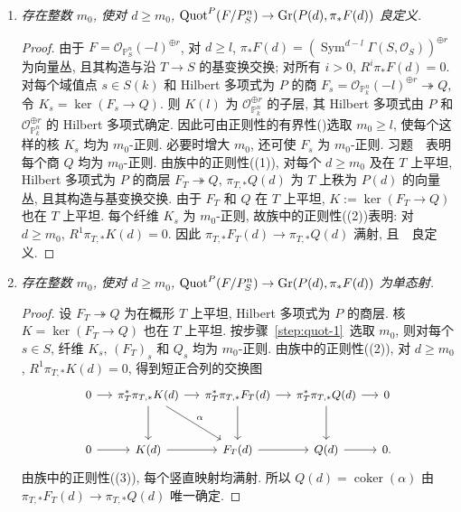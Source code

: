 \begin{enumerate}[步骤 1: ]
\item\label{step:quot-1}
\textit{存在整数 $m_0$, 使对 $d\geq m_0$, 
$\operatorname{Quot}^P(F/P_S^n)\to\operatorname{Gr}(P(d),\pi_*F(d))$ 良定义.}
\begin{proof}
由于 $F=\mathcal O_{\mathbb P_S^n}(-l)^{\oplus r}$, 对 $d\geq l$, 
$\pi_*F(d)=(\operatorname{Sym}^{d-l}\Gamma(S,\mathcal O_S))^{\oplus r}$
为向量丛, 且其构造与沿 $T\to S$ 的基变换交换; 对所有 $i>0$, $R^i\pi_*F(d)=0$.
对每个域值点 $s\in S(k)$ 和 Hilbert 多项式为 $P$ 的商
$F_s=\mathcal O_{\mathbb P_k^n}(-l)^{\oplus r}\twoheadrightarrow Q$, 
令 $K_s=\ker(F_s\to Q)$.
则 $K(l)$ 为 $\mathcal O_{\mathbb P_k^n}^{\oplus r}$ 的子层, 其 Hilbert 多项式由 $P$ 和 $\mathcal O_{\mathbb P_k^n}^{\oplus r}$ 的 Hilbert 多项式确定.
因此可由正则性的有界性()选取 $m_0\geq l$, 使每个这样的核 $K_s$ 均为 $m_0$-正则.
必要时增大 $m_0$, 还可使 $F_s$ 为 $m_0$-正则.
习题~~表明每个商 $Q$ 均为 $m_0$-正则.
由族中的正则性((1)), 对每个 $d\geq m_0$ 及在 $T$ 上平坦, Hilbert 多项式为 $P$ 的商层 $F_T\twoheadrightarrow Q$, 
$\pi_{T,*}Q(d)$ 为 $T$ 上秩为 $P(d)$ 的向量丛, 且其构造与基变换交换.
由于 $F_T$ 和 $Q$ 在 $T$ 上平坦, $K:=\ker(F_T\to Q)$ 也在 $T$ 上平坦.
每个纤维 $K_s$ 为 $m_0$-正则, 故族中的正则性((2))表明: 对 $d\geq m_0$, $R^1\pi_{T,*}K(d)=0$.
因此 $\pi_{T,*}F_T(d)\to\pi_{T,*}Q(d)$ 满射, 且~~良定义.
\end{proof}
\item\label{step:quot-2}
\textit{存在整数 $m_0$, 使对 $d\geq m_0$, 
$\operatorname{Quot}^P(F/P_S^n)\to\operatorname{Gr}(P(d),\pi_*F(d))$ 为单态射.}
\begin{proof}
设 $F_T\twoheadrightarrow Q$ 为在概形 $T$ 上平坦, Hilbert 多项式为 $P$ 的商层.
核 $K=\ker(F_T\to Q)$ 也在 $T$ 上平坦.
按步骤~\ref{step:quot-1}~选取 $m_0$, 则对每个 $s\in S$, 纤维 $K_s$, $(F_T)_s$ 和 $Q_s$ 均为 $m_0$-正则.
由族中的正则性((2)), 对 $d\geq m_0$, $R^1\pi_{T,*}K(d)=0$, 得到短正合列的交换图
\[
\begin{tikzcd}[column sep=small,row sep=large,font=\small]
0\arrow[r]&\pi_T^*\pi_{T,*}K(d)\arrow[r]\arrow[d]
\arrow[dr,"\alpha"]&
\pi_T^*\pi_{T,*}F_T(d)\arrow[r]\arrow[d]&
\pi_T^*\pi_{T,*}Q(d)\arrow[r]\arrow[d]&0\\
0\arrow[r]&K(d)\arrow[r]&F_T(d)\arrow[r]&Q(d)\arrow[r]&0.
\end{tikzcd}
\]
由族中的正则性((3)), 每个竖直映射均满射.
所以 $Q(d)=\operatorname{coker}(\alpha)$ 由 $\pi_{T,*}F_T(d)\to\pi_{T,*}Q(d)$ 唯一确定.
\end{proof}

\end{enumerate}
